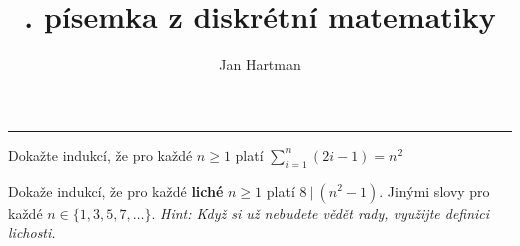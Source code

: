 \documentclass[10pt]{article}
\title{\tutnum. písemka z diskrétní matematiky}
\author{Jan Hartman}
\newcommand{\titlerule}{%
    \noindent %
    \makebox[\textwidth]{\large \thetitle \hfill Jméno: \hspace{4cm}}
    \rule{\textwidth}{0.4pt}%
}
\begin{document}
\titlerule

\begin{problem}[6 bodů]
Dokažte indukcí, že pro každé $n \geq 1$ platí $\sum_{i=1}^{n}(2i-1) = n^2$
\end{problem}

\begin{problem}[4 body]

Dokaže indukcí, že pro každé \textbf{liché} $n \geq 1$ platí $8 \ | \ (n^2 - 1)$. Jinými slovy pro každé $n \in \{1,3,5,7,\ldots\}$. \textit{Hint: Když si už nebudete vědět rady, využijte definici lichosti.}

\end{problem}
\end{document}

